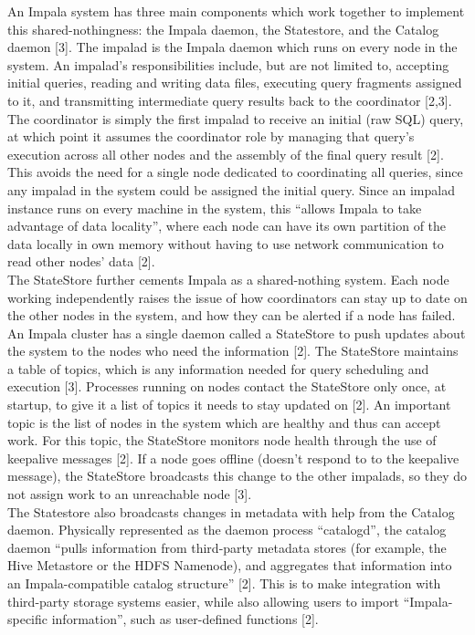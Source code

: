 \documentclass[onecolumn, draftclsnofoot,10pt, compsoc]{IEEEtran}
\begin{document}
\indent An Impala system has three main components which work together to implement this shared-nothingness: the Impala daemon, the Statestore, and the Catalog daemon [3]. The impalad is the Impala daemon which runs on every node in the system. An impalad’s responsibilities include, but are not limited to, accepting initial queries, reading and writing data files, executing query fragments assigned to it, and transmitting intermediate query results back to the coordinator [2,3]. The coordinator is simply the first impalad to receive an initial (raw SQL) query, at which point it assumes the coordinator role by managing that query’s execution across all other nodes and the assembly of the final query result [2]. This avoids the need for a single node dedicated to coordinating all queries, since any impalad in the system could be assigned the initial query. Since an impalad instance runs on every machine in the system, this “allows Impala to take advantage of data locality”, where each node can have its own partition of the data locally in own memory without having to use network communication to read other nodes’ data [2]. \\

\indent The StateStore further cements Impala as a shared-nothing system. Each node working independently raises the issue of how coordinators can stay up to date on the other nodes in the system, and how they can be alerted if a node has failed. An Impala cluster has a single daemon called a StateStore to push updates about the system to the nodes who need the information [2]. The StateStore maintains a table of topics, which is any information needed for query scheduling and execution [3]. Processes running on nodes contact the StateStore only once, at startup, to give it a list of topics it needs to stay updated on [2]. An important topic is the list of nodes in the system which are healthy and thus can accept work. For this topic, the StateStore monitors node health through the use of keepalive messages [2]. If a node goes offline (doesn’t respond to to the keepalive message), the StateStore broadcasts this change to the other impalads, so they do not assign work to an unreachable node [3]. \\

\indent The Statestore also broadcasts changes in metadata with help from the Catalog daemon. Physically represented as the daemon process “catalogd”, the catalog daemon “pulls information from third-party metadata stores (for example, the Hive Metastore or the HDFS Namenode), and aggregates that information into an Impala-compatible catalog structure” [2]. This is to make integration with third-party storage systems easier, while also allowing users to import “Impala-specific information”, such as user-defined functions [2]. \\
	
\nocite{*}


\end{document}
